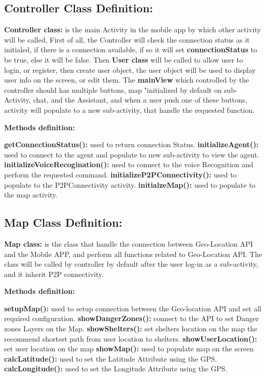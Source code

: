 \documentclass{scrreprt}
\begin{document}
\clearpage

\subsection{Controller Class Definition:}

 \textbf{Controller class:} is the main Activity in the mobile app by which other activity will be called,  First of all, the Controller will check the connection status as it initialed, if there is a connection available, if so it will set \textbf{connectionStatus} to be true, else it will be false. Then \textbf{User class} will be called to allow user to login, or register, then create user object, the user object will be used to display user info on the screen, or edit them.
The \textbf{mainView} which controlled by the controller should has multiple buttons, map "initialized by default on sub-Activity, chat, and the Assistant, and when a user push one of these buttons, activity will populate to a new sub-activity, that handle the requested function.

\textbf{Methods definition:}

\textbf{getConnectionStatus():} used to return connection Status.
\textbf{initializeAgent():} used to connect to the agent and populate to new sub-activity to view the agent.
\textbf{initializeVoiceRecogination():} used to connect to the voice Recognition and perform the requested command.
\textbf{initializeP2PConnectivity():} used to populate to the P2PConnectivity activity.
\textbf{initialzeMap():} used to populate to the map activity.

\subsection{Map Class Definition:}

\textbf{Map class:} is the class that handle the connection between Geo-Location API and the Mobile APP, and perform all functions related to Geo-Location API.
The class will be called by controller by default after the user log-in as a sub-activity, and it inherit P2P connectivity.

\textbf{Methods definition:}

\textbf{setupMap():} used to setup connection between the Geo-location API and set all required configuration.
\textbf{showDangerZones():} connect to the API to set Danger zones Layers on the Map. 
\textbf{showShelters():} set shelters location on the map the recommend shortest path from user location to shelters.
\textbf{showUserLocation():} set user location on the map
\textbf{showMap():} used to populate map on the screen
\textbf{calcLatitude():} used to  set the Latitude Attribute using the GPS.
\textbf{calcLongitude():} used to  set the Longitude Attribute using the GPS.
\end{document}
